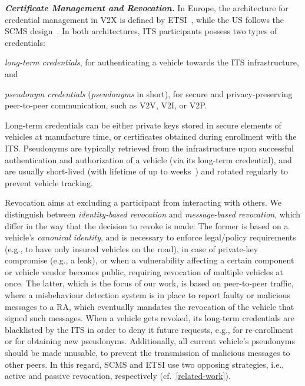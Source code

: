 \noindent\textbf{\emph{Certificate Management and Revocation.}}
%
In Europe, the architecture for credential management in \ac{V2X} is defined by
ETSI~\cite{etsi2021102940,etsi2022102941}, while the US follows the \ac{SCMS}
design~\cite{brecht2018scms}. In both architectures, \ac{ITS} participants
possess two types of credentials: %
%
\begin{inparaenum}
    \item \emph{long-term credentials}, for authenticating a vehicle towards the
    \ac{ITS} infrastructure, and
    \item \emph{pseudonym credentials} (\emph{pseudonyms} in short), for secure
    and privacy-preserving peer-to-peer communication, such as \ac{V2V},
    \ac{V2I}, or \ac{V2P}.
\end{inparaenum} 
%
Long-term credentials can be either private keys stored in secure elements of
vehicles at manufacture time, or certificates obtained during enrollment with
the \ac{ITS}. Pseudonyms are typically retrieved from the infrastructure upon
successful authentication and authorization of a vehicle (via its long-term
credential), and are usually short-lived (with lifetime of up to
weeks~\cite{etsi2018tr04103415}) and rotated regularly to prevent vehicle
tracking.

Revocation aims at excluding a participant from interacting with others. We
distinguish between \emph{identity-based revocation} and \emph{message-based
revocation}, which differ in the way that the decision to revoke is made: The
former is based on a vehicle's \emph{canonical identity}, and is necessary to
enforce legal/policy requirements (e.g., to have only insured vehicles on the
road), in case of private-key compromise (e.g., a leak), or when a vulnerability
affecting a certain component or vehicle vendor becomes public, requiring
revocation of multiple vehicles at once. The latter, which is the focus of our
work, is based on peer-to-peer traffic, where a misbehaviour detection system is
in place to report faulty or malicious messages to a \ac{RA}, which eventually
mandates the revocation of the vehicle that signed such messages. When a vehicle
gets revoked, its long-term credentials are blacklisted by the \ac{ITS} in order
to deny it future requests, e.g., for re-enrollment or for obtaining new
pseudonyms. Additionally, all current vehicle's pseudonyms should be made
unusable, to prevent the transmission of malicious messages to other peers. In
this regard, \ac{SCMS} and ETSI use two opposing strategies, i.e., active and
passive revocation, respectively (cf.~\cref{related-work}).

